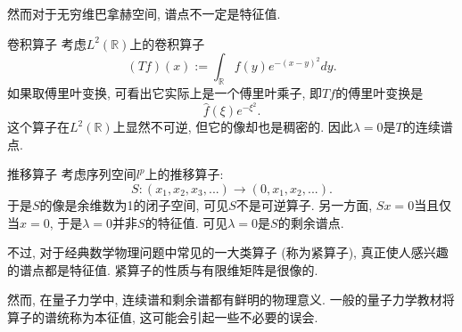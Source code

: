 然而对于无穷维巴拿赫空间, 谱点不一定是特征值.

\begin{example}{卷积算子}
考虑$L^2(\mathbb{R})$上的卷积算子
$$
(Tf)(x):=\int_{\mathbb{R}}f(y)e^{-(x-y)^2}dy.
$$
如果取傅里叶变换, 可看出它实际上是一个傅里叶乘子, 即$Tf$的傅里叶变换是
$$
\hat f(\xi)e^{-\xi^2}.
$$
这个算子在$L^2(\mathbb{R})$上显然不可逆, 但它的像却也是稠密的. 因此$\lambda=0$是$T$的连续谱点.
\end{example}

\begin{example}{推移算子}
考虑序列空间$l^p$上的推移算子:
$$
S:(x_1,x_2,x_3,...)\to(0,x_1,x_2,...).
$$
于是$S$的像是余维数为1的闭子空间, 可见$S$不是可逆算子. 另一方面, $Sx=0$当且仅当$x=0$, 于是$\lambda=0$并非$S$的特征值. 可见$\lambda=0$是$S$的剩余谱点.
\end{example}

不过, 对于经典数学物理问题中常见的一大类算子 (称为紧算子), 真正使人感兴趣的谱点都是特征值. 紧算子的性质与有限维矩阵是很像的.

然而, 在量子力学中, 连续谱和剩余谱都有鲜明的物理意义. 一般的量子力学教材将算子的谱统称为本征值, 这可能会引起一些不必要的误会.
